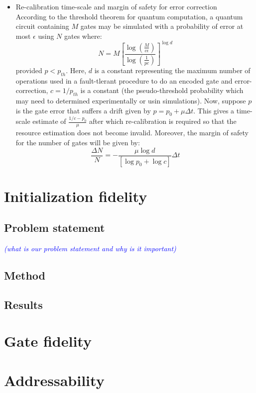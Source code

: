 \documentclass[conference]{IEEEtran}
\begin{document}
\begin{itemize}
\item Re-calibration time-scale and margin of safety for error correction\\
According to the threshold theorem for quantum computation, a quantum circuit containing $M$ gates may be simulated with a probability of error at most $\epsilon$ using $N$ gates where:
\begin{equation}
N = M \left[\frac{\log \left(\frac{M}{c\epsilon}\right)}
{\log \left(\frac{1}{pc}\right)}
\right]^{\log d}
\end{equation}
provided $p<p_{th}$. Here, $d$ is a constant representing the maximum number of operations used in a fault-tlerant procedure to do an encoded gate and error-correction, $c=1/p_{th}$ is a constant (the pseudo-threshold probability which may need to determined experimentally or usin simulations). Now, suppose $p$ is the gate error that suffers a drift given by $p = p_0 + \mu \Delta t$. 
This gives a time-scale estimate of $\frac{1/c-p_0}{\mu}$ after which re-calibration is required so that the resource estimation does not become invalid. 
Moreover, the margin of safety for the number of gates will be given by:
\begin{equation}
\frac{\Delta N}{N} = -
\frac{\mu\log d}{[\log p_0 + \log c]}\Delta t
\end{equation}
\end{itemize}

\section{Initialization fidelity}
\subsection{Problem statement}
\textcolor{blue}{\textit{(what is our problem statement and why is it important)}}
\subsection{Method}
\subsection{Results}

\section{Gate fidelity}
\section{Addressability}
\end{document}
